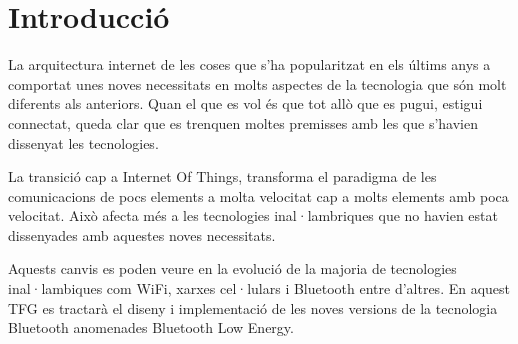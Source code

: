 \cleardoublepage
{}
\chapter*{Introducció}
La arquitectura internet de les coses que s'ha popularitzat en els últims anys a comportat unes noves necessitats en molts aspectes de la tecnologia que són molt diferents als anteriors. Quan el que es vol és que tot allò que es pugui, estigui connectat, queda clar que es trenquen moltes premisses amb les que s'havien dissenyat les tecnologies.

La transició cap a Internet Of Things, transforma el paradigma de les comunicacions de pocs elements a molta velocitat cap a molts elements amb poca velocitat. Això afecta més a les tecnologies inal·lambriques que no havien estat dissenyades amb aquestes noves necessitats.

Aquests canvis es poden veure en la evolució de la majoria de tecnologies inal·lambiques com WiFi, xarxes cel·lulars i Bluetooth entre d'altres. En aquest TFG es tractarà el diseny i implementació de les noves versions de la tecnologia Bluetooth anomenades Bluetooth Low Energy.

